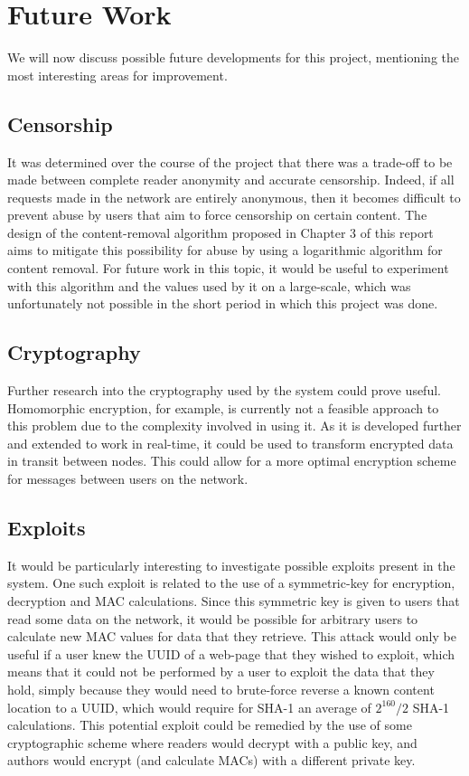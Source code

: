 \chapter{Future Work}

We will now discuss possible future developments for this project, mentioning the most
interesting areas for improvement.

\section{Censorship}

It was determined over the course of the project that there was a trade-off to be made between complete
reader anonymity and accurate censorship. Indeed, if all requests made in the network
are entirely anonymous, then it becomes difficult to prevent abuse by users that
aim to force censorship on certain content. The design of the content-removal algorithm
proposed in Chapter 3 of this report aims to mitigate this possibility for abuse
by using a logarithmic algorithm for content removal. For future work in this
topic, it would be useful to experiment with this algorithm and the values used by
it on a large-scale, which was unfortunately not possible in the short period in which this
project was done.

\section{Cryptography}

Further research into the cryptography used by the system could prove useful.
Homomorphic encryption, for example, is currently not a feasible approach to this problem due to
the complexity involved in using it. As it is developed further and extended to work
in real-time, it could be used to transform encrypted data in transit between nodes.
This could allow for a more optimal encryption scheme for messages between
users on the network.

\section{Exploits}

It would be particularly interesting to investigate possible exploits present in the
system. One such exploit is related to the use of a symmetric-key for encryption,
decryption and MAC calculations. Since this symmetric key is given to users that read
some data on the network, it would be possible for arbitrary users to calculate new
MAC values for data that they retrieve. This attack would only be useful if a user
knew the UUID of a web-page that they wished to exploit, which means that it could
not be performed by a user to exploit the data that they hold, simply because they
would need to brute-force reverse a known content location to a UUID, which would
require for SHA-1 an average of $2^{160} / 2$ SHA-1 calculations.
This potential exploit could be remedied by the use of some cryptographic scheme where
readers would decrypt with a public key, and authors would encrypt (and calculate MACs)
with a different private key.

